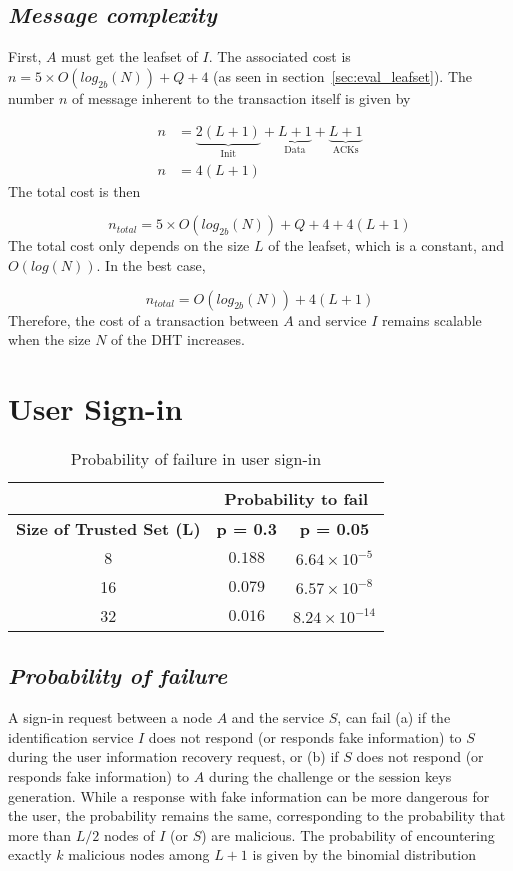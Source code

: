     
  \subsection{\textit{Message complexity}}
    First, $A$ must get the leafset of $I$. The associated cost is $n = 5
\times O(log_{2b}(N)) + Q + 4$ (as seen in section~\ref{sec:eval_leafset}).
    The number $n$ of message inherent to the transaction itself is given by

    \begin{align}
      n &= \underbrace{2(L+1)}_\text{Init} + \underbrace{L+1}_\text{Data} +  \underbrace{L+1}_\text{ACKs}\\
      n &= 4(L+1)
    \end{align}
     The total cost is then

    $$
      n_{total} = 5 \times O(log_{2b}(N)) + Q + 4 + 4(L+1)
    $$    
    The total cost only depends on the size $L$ of the leafset, which is a
constant, and $O(log(N))$. In the best case, 

    $$
      n_{total} = O(log_{2b}(N)) + 4(L+1)
    $$
    Therefore, the cost of a transaction between $A$ and service $I$ remains
scalable when the size $N$ of the DHT increases.


\section{User Sign-in}
\label{sec:eval_sign_in}
  \begin{table}
    \centering
    \footnotesize
    \begin{tabular}{|c|c|c|}
      \cline{2-3}
      \multicolumn{1}{c|}{}&  \multicolumn{2}{c|}{\textbf{Probability to fail}} \\ \cline{2-3}
      \hline
      \textbf{Size of Trusted Set (L)} & \textbf{p = 0.3} & \textbf{p = 0.05} \\
      \hline \hline
      8 &  $0.188$ & $6.64 \times 10^{-5}$ \\
      \hline
      16 & $0.079$ & $6.57 \times 10^{-8}$  \\
      \hline
      32 & $0.016$ & $8.24 \times 10^{-14}$  \\
      \hline
    \end{tabular}
    \caption{Probability of failure in user sign-in}
    \label{tab:p_sign_in}
  \end{table}
  
  \subsection{\textit{Probability of failure}}
    A sign-in request between a node $A$ and the service $S$, can fail (a) if the identification service $I$ does
not respond (or responds fake information) to $S$ during the user information recovery
request, or (b) if $S$ does not respond (or responds fake information) to $A$
during the challenge or the session keys generation. While a response with fake information can be more dangerous for the
user, the probability remains the same, corresponding to the
probability that more than $L/2$ nodes of $I$ (or $S$) are malicious. The probability of
encountering exactly $k$ malicious nodes among $L +1$ is given by the binomial
distribution

